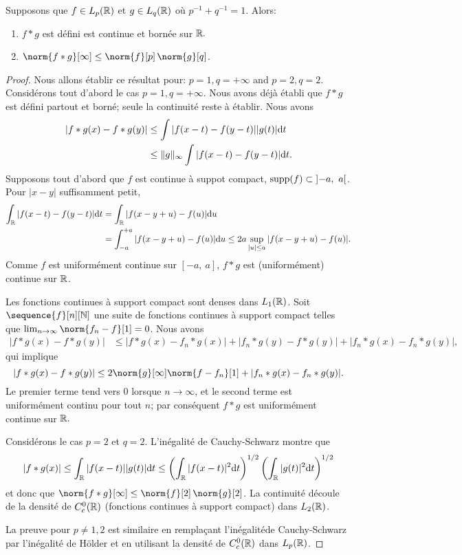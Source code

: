 \begin{proposition}
Supposons que $f\in L_{p}(\mathbb{R})$ et $g\in L_{q}(\mathbb{R})$ o\`u $p^{-1}+q^{-1}=1$. Alors:
\begin{enumerate}[label=(\roman*)]
\item $f*g$ est d\'efini est continue et born\'ee sur  $\mathbb{R}.$
\item $\norm{f*g}[\infty]\leq \norm{f}[p] \, \norm{g}[q]$.
\end{enumerate}
\end{proposition}
\begin{proof}
Nous allons \'etablir ce r\'esultat pour: $p=1,  q=+\infty$ and $p=2, q=2.$
Consid\'erons tout d'abord le cas $p=1, q=+\infty.$
Nous avons d\'ej\`a \'etabli  que $f*g$ est d\'efini partout et born\'e; seule la continuit\'e reste \`a \'etablir. Nous avons
\begin{align*}
|f*g(x)-f*g(y)| &\leq\int|f(x-t)-f(y-t)||g(t)|\mathrm{d} t \\
&\leq\Vert g\Vert_{\infty}\int|f(x-t)-f(y-t)|\mathrm{d} t.
\end{align*}
 Supposons tout d'abord que $f$ est continue \`a suppot compact, $\mathrm{supp}(f) \subset\left]-a,\ a\right[$.
 Pour $|x-y|$ suffisamment petit,
\begin{align*}
\int_{\mathbb{R}}|f(x-t)-f(y-t)|\mathrm{d} t
&=\int_{\mathbb{R}}|f(x-y+u)-f(u)|\mathrm{d} u \\
&=\int_{-a}^{+a}|f(x-y+u)-f(u)|\mathrm{d} u \leq 2a\sup_{|u|\leq a}|f(x-y+u)-f(u)|.
\end{align*}
Comme $f$ est uniform\'ement continue sur $[-a,\ a]$,  $f*g$ est (uniform\'ement) continue sur $\mathbb{R}$.

Les fonctions continues \`a support compact sont denses dans $L_1(\mathbb{R})$.
Soit $\sequence{f}[n][\nset]$ une suite de fonctions continues \`a support compact telles que
$\lim_{n\rightarrow\infty} \norm{f_{n}-f}[1]=0$. Nous avons
\begin{align*}
|f*g(x)-f*g(y)|&\leq|f*g(x)-f_{n}*g(x)|+|f_{n}*g(y)-f*g(y)| +|f_{n}*g(x)-f_{n}*g(y)|,
\end{align*}
qui implique
$$
|f*g(x)-f*g(y)|\leq 2 \norm{g}[\infty] \norm{f-f_{n}}[1]+|f_{n}*g(x)-f_{n}*g(y)|.
$$
Le premier terme tend vers $0$ lorsque $n \to \infty$, et le second terme est uniform\'ement continu pour tout $n$;
par cons\'equent $f*g$ est uniform\'ement continue sur $\mathbb{R}.$



Consid\'erons le cas $p=2$ et  $q=2$. L'in\'egalit\'e de Cauchy-Schwarz montre que
$$
|f*g(x)|\displaystyle \leq\int_{\mathbb{R}}|f(x-t)||g(t)|\mathrm{d} t\leq \left(\int_{\mathbb{R}}|f(x-t)|^{2}\mathrm{d} t\right)^{1/2} \left(\int_{\mathbb{R}}|g(t)|^{2}\mathrm{d} t \right)^{1/2}
$$
 et donc que $\norm{f*g}[\infty] \leq \norm{f}[2] \, \norm{g}[2]$.
  La continuit\'e d\'ecoule de la densit\'e de $C_{c}^{0}(\mathbb{R})$  (fonctions continues \`a support compact) dans $L_{2}(\mathbb{R})$.

La preuve pour $p\neq 1,2$ est similaire en rempla\c{c}ant l'in\'egalit\'ede Cauchy-Schwarz par l'in\'egalit\'e de H\"older et en utilisant la densit\'e de $C_c^0(\mathbb{R})$ dans $L_p(\mathbb{R})$.
\end{proof}

